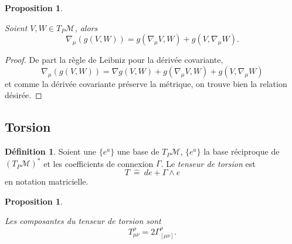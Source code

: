 \documentclass[a4paper,11pt]{report}
\theoremstyle{definition}
\theoremstyle{plain}
\newtheorem{prop}[thm]{Proposition}
\theoremstyle{definition}
\newtheorem{defn}{Définition}[chapter]
\theoremstyle{remark}
\newcommand{\M}{\mathscr{M}}
\begin{document}
                \begin{prop}\begin{leftbar}
                    Soient $V,W\in T_P\M$, alors
                    \begin{equation}
                        \nabla_\mu(g(V,W)) = g(\nabla_\mu V,W) + g(V,\nabla_\mu W).
                    \end{equation}
                \end{leftbar}\end{prop}
                
                \begin{proof}
                    De part la règle de Leibniz pour la dérivée covariante,
                    \begin{equation}
                         \nabla_\mu(g(V,W)) = \nabla g(V,W) + g(\nabla_\mu V,W) + g(V,\nabla_\mu W)
                    \end{equation}
                    et comme la dérivée covariante préserve la métrique, on trouve bien la relation désirée.
                \end{proof}
            
            \subsection{Torsion}
            
                \begin{defn}
                    Soient une $\{e^a\}$ une base de $T_P\M$, $\{e^a\}$ la base réciproque de $(T_P\M)^*$ et les coefficients de connexion $\Gamma$. Le \textit{tenseur de torsion} est
                    \begin{equation}
                        T ~\hat{=}~ de+\Gamma\wedge e
                    \end{equation}
                    en notation matricielle.
                \end{defn}
                
                \begin{prop}\begin{leftbar}
                    Les composantes du tenseur de torsion sont
                    \begin{equation}
                        T^\rho_{\mu\nu} = 2\Gamma^\rho_{[\mu\nu]}.
                    \end{equation}
                \end{leftbar}\end{prop}
                
\end{document}
